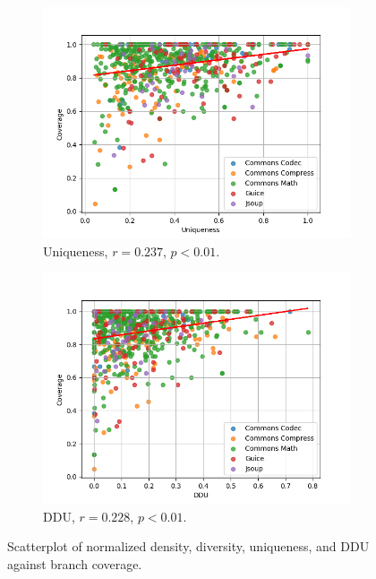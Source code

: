 \documentclass[twoside,a4paper,11pt]{memoir}
\begin{document}
\begin{figure}
    \begin{subfigure}[b]{0.49\linewidth}
        \centering
        \includegraphics[width=\linewidth]{figures/coverage_uniqueness}
        \caption{Uniqueness, \(r=0.237 \), \(p<0.01 \).}%
        \label{fig:coverage_uniqueness}
    \end{subfigure}
    \hfill
    \begin{subfigure}[b]{0.49\linewidth}
        \centering
        \includegraphics[width=\linewidth]{figures/coverage_ddu}
        \caption{DDU, \(r=0.228 \), \(p<0.01 \).}%
        \label{fig:coverage_ddu}
    \end{subfigure}
    \caption{Scatterplot of normalized density, diversity, uniqueness, and DDU against branch coverage.}%
    \label{fig:coverage_metric}
\end{figure}
\end{document}
